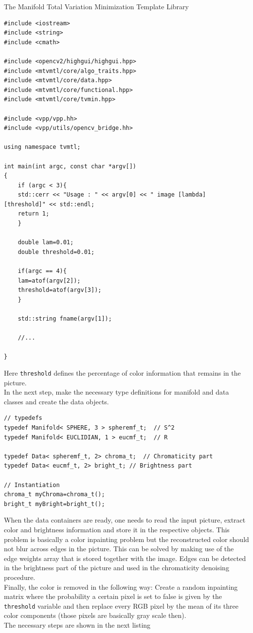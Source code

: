 \begin{chapter}{The Manifold Total Variation Minimization Template Library}
\cppinline
\begin{lstlisting}[label=code:tut2_init,caption={Include library files and read parameters from standard input}]
#include <iostream>
#include <string>
#include <cmath>

#include <opencv2/highgui/highgui.hpp>
#include <mtvmtl/core/algo_traits.hpp>
#include <mtvmtl/core/data.hpp>
#include <mtvmtl/core/functional.hpp>
#include <mtvmtl/core/tvmin.hpp>

#include <vpp/vpp.hh>
#include <vpp/utils/opencv_bridge.hh>

using namespace tvmtl;

int main(int argc, const char *argv[])
{
    if (argc < 3){
	std::cerr << "Usage : " << argv[0] << " image [lambda] [threshold]" << std::endl;
	return 1;
    }

    double lam=0.01;
    double threshold=0.01;

    if(argc == 4){
	lam=atof(argv[2]);
	threshold=atof(argv[3]);
    }   

    std::string fname(argv[1]);

    //...

}
\end{lstlisting}
Here \texttt{threshold} defines the percentage of color information that remains in the picture.\\
In the next step, make the necessary type definitions for manifold and data classes and create the data objects.

\cppinline
\begin{lstlisting}[label=code:tut2_mfdata,caption={Manifold and Data class type definitions and instantiation}]
// typedefs
typedef Manifold< SPHERE, 3 > spheremf_t;  // S^2
typedef Manifold< EUCLIDIAN, 1 > eucmf_t;  // R
 
typedef Data< spheremf_t, 2> chroma_t;	// Chromaticity part
typedef Data< eucmf_t, 2> bright_t;	// Brightness part

// Instantiation
chroma_t myChroma=chroma_t();
bright_t myBright=bright_t();
\end{lstlisting}

When the data containers are ready, one needs to read the input picture, extract color and brightness information and store it in the respective objects.
This problem is basically a color inpainting problem but the reconstructed color should not blur across edges in the picture. This can be solved
by making use of the edge weights array that is stored together with the image. Edges can be detected in the brightness part of the picture and used in the chromaticity denoising procedure.\\
Finally, the color is removed in the following way: Create a random inpainting matrix where the probability a certain pixel is set to false is given
by the \texttt{threshold} variable and then replace every RGB pixel by the mean of its three color components (those pixels are basically gray scale then).\\
The necessary steps are shown in the next listing


\end{chapter}
